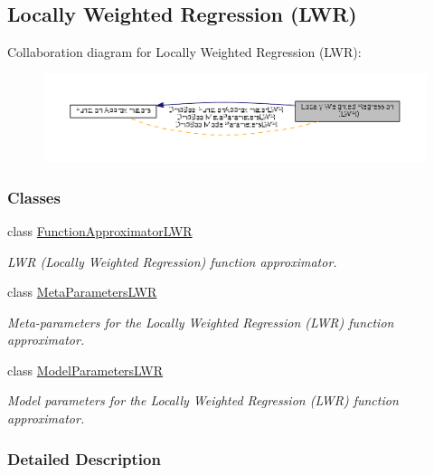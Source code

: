 \hypertarget{group__LWR}{\subsection{Locally Weighted Regression (L\+W\+R)}
\label{group__LWR}
}
Collaboration diagram for Locally Weighted Regression (L\+W\+R)\+:
\nopagebreak
\begin{figure}[H]
\begin{center}
\leavevmode
\includegraphics[width=350pt]{group__LWR}
\end{center}
\end{figure}
\subsubsection*{Classes}
\begin{DoxyCompactItemize}
\item 
class \hyperlink{classDmpBbo_1_1FunctionApproximatorLWR}{Function\+Approximator\+L\+W\+R}
\begin{DoxyCompactList}\small\item\em L\+W\+R (Locally Weighted Regression) function approximator. \end{DoxyCompactList}\item 
class \hyperlink{classDmpBbo_1_1MetaParametersLWR}{Meta\+Parameters\+L\+W\+R}
\begin{DoxyCompactList}\small\item\em Meta-\/parameters for the Locally Weighted Regression (L\+W\+R) function approximator. \end{DoxyCompactList}\item 
class \hyperlink{classDmpBbo_1_1ModelParametersLWR}{Model\+Parameters\+L\+W\+R}
\begin{DoxyCompactList}\small\item\em Model parameters for the Locally Weighted Regression (L\+W\+R) function approximator. \end{DoxyCompactList}\end{DoxyCompactItemize}


\subsubsection{Detailed Description}
